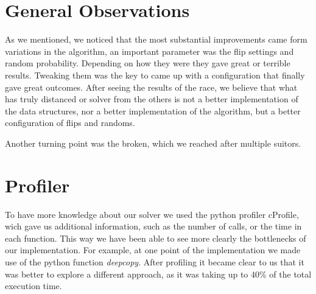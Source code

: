 \documentclass{article}
\begin{document}

\section{General Observations}
As we mentioned, we noticed that the most substantial improvements came form variations in the algorithm,
an important parameter was the flip settings and random probability. Depending on how they were they 
gave great or terrible results. Tweaking them was the key to came up with a configuration that finally
gave great outcomes. After seeing the results of the race, we believe that what has truly distanced 
or solver from the others is not a better implementation of the data structures, nor a better 
implementation of the algorithm, but a better configuration of flips and randoms.

Another turning point was the broken, which we reached after multiple suitors.



\section{Profiler}
To have more knowledge about our solver we used the python profiler cProfile, wich gave us 
additional information, such as the number of calls, or the time in each function. This 
way we have been able to see more clearly the bottlenecks of our implementation. For 
example, at one point of the implementation we made use of the python function \textit{deepcopy}.
After profiling it became clear to us that it was better to explore a different approach, 
as it was taking up to 40\% of the total execution time.


\end{document}
